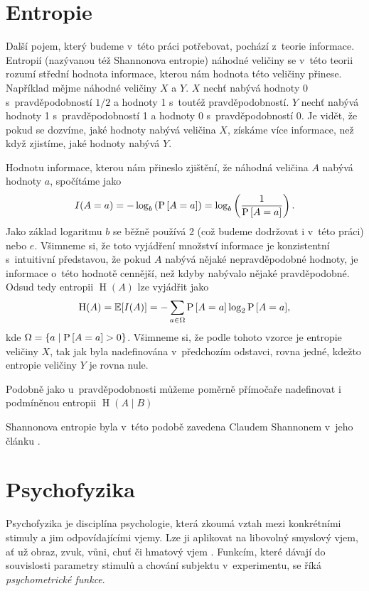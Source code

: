 \section{Entropie}

Další pojem, který budeme v~této práci potřebovat, pochází z~teorie informace.
Entropií (nazývanou též Shannonova entropie) náhodné veličiny se v~této teorii
rozumí střední hodnota informace, kterou nám hodnota této veličiny přinese.
Například mějme náhodné veličiny $X$ a $Y$\!. $X$ nechť nabývá hodnoty 0
s~pravděpodobností $1/2$ a hodnoty 1 s~toutéž pravděpodobností. $Y$ nechť nabývá
hodnoty 1 s~pravděpodobností 1 a hodnoty 0 s~pravděpodobností 0. Je vidět, že
pokud se dozvíme, jaké hodnoty nabývá veličina $X$, získáme více informace, než
když zjistíme, jaké hodnoty nabývá $Y$.  \def\H{\operatorname{H}}

Hodnotu informace, kterou nám přineslo zjištění, že náhodná veličina $A$ nabývá
hodnoty $a$, spočítáme jako $$I(A=a)=-\log_b\left({\P{A=a}}\right)=\log_b\left(\frac1{\P{A=a}}\right).$$ Jako
základ logaritmu $b$ se běžně používá 2 (což budeme dodržovat i v~této práci) nebo $e$. 
Všimneme si, že toto vyjádření množství informace je konzistentní
s~intuitivní představou, že pokud $A$ nabývá nějaké nepravděpodobné
hodnoty, je informace o~této hodnotě cennější, než kdyby nabývalo nějaké pravděpodobné. Odsud tedy
entropii $\H(A)$ lze vyjádřit jako $$\H(A)=\mathbb{E}[I(A)]=-\displaystyle\sum_{a
\in \Omega}\P{A=a}\log_2{\P{A=a}},$$ kde $\Omega = \{a\mid\P{A=a} > 0\}$.
Všimneme si, že podle tohoto vzorce je entropie veličiny $X$, tak jak byla
nadefinována v~předchozím odstavci, rovna jedné, kdežto  entropie veličiny $Y$
je rovna nule.

Podobně jako u~pravděpodobnosti můžeme poměrně přímočaře nadefinovat i   
podmíněnou entropii $\H(A\mid B)$

Shannonova entropie byla v~této podobě zavedena Claudem Shannonem v~jeho článku \citeyearpar{Entropie}. 

\section{Psychofyzika}

Psychofyzika je disciplína psychologie, která zkoumá vztah mezi konkrétními
stimuly a jim odpovídajícími vjemy. Lze ji aplikovat na libovolný smyslový
vjem, ať už obraz, zvuk, vůni, chuť či hmatový vjem \citep{psychophysics}.
Funkcím, které dávají do souvislosti parametry stimulů a chování subjektu
v~experimentu, se říká {\it psychometrické funkce}. 

